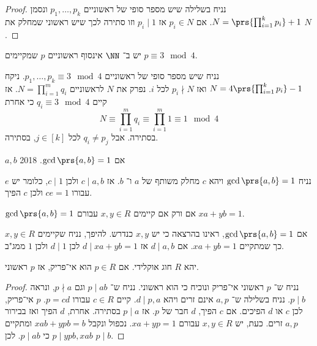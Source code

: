 \documentclass[a4paper,10pt,twoside,openany]{book}
\begin{document}
\begin{proof}
נניח בשלילה שיש מספר סופי של ראשוניים
$p_1, \ldots, p_k$
ונסמן
$N = \prs{\prod_{i=1}^k p_i} + 1$.
אם
$p_i \in N$
אז
$p_i \mid 1$
וזו סתירה לכך שיש ראשוני שמחלק את
$N$.
\end{proof}
\begin{exercise}
יש
ב־%
$\NN$
אינסוף ראשוניים
$p$
שמקיימים
$p \equiv 3 \mod{4}$.
\end{exercise}
\begin{solution}
נניח שיש מספר סופי של ראשוניים
$p_1, \ldots, p_k \equiv 3 \mod{4}$.
ניקח
$N = 4 \prs{\prod_{i=1}^k p_i} - 1$
ואז
$p_i \nmid N$
לכל
$i$.
נפרק את
$N$
לראשוניים
$N = \prod_{i=1}^m q_i$.
אז קיים
$q_i \equiv 3 \mod{4}$
כי אחרת
\[ N \equiv \prod_{i=1}^m q_i \equiv \prod_{i=1}^m 1 \equiv 1 \mod{4}\]
בסתירה.
אבל
$q_i \neq p_j$
לכל
$j \in [k]$,
בסתירה.
\end{solution}
\begin{definition}
$a,b$
אם
$\gcd\prs{a,b} = 1$. %
{2018}
\end{definition}
\begin{theorem}
נניח
$\gcd\prs{a,b} = 1$
ויהא
$c$
מחלק משותף של
$a$
ו־%
$b$.
אז
$c\mid a,b$
ולכן
$c \mid 1$,
כלומר יש
$e$
עבורו
$ce = 1$
ולכן
$c$
הפיך.
\end{theorem}
\begin{proposition}
$\gcd\prs{a,b} = 1$
אם ורק אם קיימים
$x,y \in R$
עבורם
$xa + yb = 1$.
\end{proposition}
\begin{proposition}
אם
$\gcd\prs{a,b} = 1$,
ראינו בהרצאה כי יש
$x,y$
כנדרש.
להיפך, נניח שקיימים
$x,y \in R$
כך שמתקיים
$xa + yb = 1$.
אם
$d \mid a,b$
אז
$d \mid xa + yb = 1$
לכן
$d \mid 1$
ולכן
$1$
ממג"ב.
\end{proposition}
\begin{theorem}
יהא
$R$
חוג אוקלידי. אם
$p \in R$
הוא אי־פריק, אז
$p$
ראשוני.
\end{theorem}
\begin{proof}
נניח ש־%
$p$
ראשוני אי־פריק ונוכיח כי הוא ראשוני. נניח ש־%
$p\mid ab$
וגם
$p \nmid a$,
ונראה
$p \mid b$.
נניח בשלילה ש־%
$a,p$
אינם זרים
ויהא
$d \mid p,a$.
קיים
$c \in R$
עבורו
$p = cd$.
$p$
אי־פריק, לכן $c$ או
$d$
הפיכים.
אם
$c$
הפיך, $d$ חבר של
$p$.
אז
$p \mid a$
בסתירה.
אחרת,
$d$
הפיך ואז בבירור
$a,p$
זרים.
כעת, יש
$x,y \in R$
עבורם
$xa + yp = 1$.
נכפול ונקבל
$xab + ypb = b$
ומתקיים
$p \mid ypb, xab$
כי
$p \mid ab$.
לכן
$p \mid b$.
\end{proof}
\end{document}
